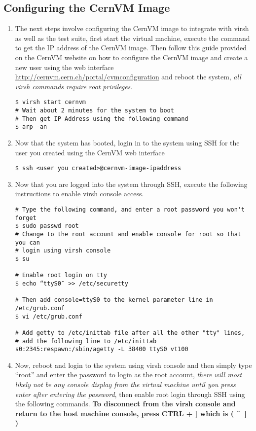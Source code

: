 \subsection{Configuring the CernVM Image}
\label{sec:rhcernvmconfig}
\begin{enumerate}
\item 	The next steps involve configuring the CernVM image to integrate with virsh as well as the test suite, first
		start the virtual machine, execute the command to get the IP address of the CernVM image. Then follow this guide
		provided on the CernVM website on how to configure the CernVM image and create a new user using the web interface 
		\url{http://cernvm.cern.ch/portal/cvmconfiguration} and reboot the system, \emph{all virsh commands require root 
		privileges}.
		
\begin{lstlisting}
$ virsh start cernvm
# Wait about 2 minutes for the system to boot 
# Then get IP Address using the following command
$ arp -an
\end{lstlisting}

\item 	Now that the system has booted, login in to the system using SSH for the user you created using the CernVM web interface
\begin{lstlisting}
$ ssh <user you created>@cernvm-image-ipaddress
\end{lstlisting}

\item	Now that you are logged into the system through SSH, execute the following instructions to enable virsh console access.
		
\lstset{caption= Enable Virsh Console Access}
\begin{lstlisting}
# Type the following command, and enter a root password you won't forget
$ sudo passwd root
# Change to the root account and enable console for root so that you can 
# login using virsh console
$ su

# Enable root login on tty
$ echo “ttyS0″ >> /etc/securetty

# Then add console=ttyS0 to the kernel parameter line in /etc/grub.conf
$ vi /etc/grub.conf

# Add getty to /etc/inittab file after all the other "tty" lines, 
# add the following line to /etc/inittab
s0:2345:respawn:/sbin/agetty -L 38400 ttyS0 vt100

\end{lstlisting}

\item 	Now, reboot and login to the system using virsh console and then simply type ``root'' and enter the password to login as the 
		root account, \emph{there will most likely not be any console display from the virtual machine until you press 
		enter after entering the password}, then enable root login through SSH using the following commands. {\bf To 
		disconnect from the virsh console and return to the host machine console, press CTRL + ]  which is ( \^~] )}
				

\end{enumerate}
